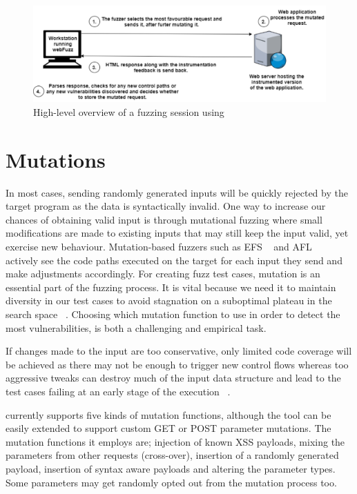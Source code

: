 \begin{figure}[ht]
 \centering
 \captionsetup{justification=centering}
 \includegraphics[width=\linewidth]{figures/architecture.pdf}
 \caption{High-level overview of a fuzzing session using \pname{}}
 \label{fig:architecture}
\end{figure}

\section{Mutations}
In most cases, sending randomly generated inputs will be quickly rejected by the target program as the data is syntactically invalid. One way to increase our chances of obtaining valid input is through mutational fuzzing where small modifications are made to existing inputs that may still keep the input valid, yet exercise new behaviour. Mutation-based fuzzers such as EFS ~\cite{efs2007} and AFL ~\cite{zalewski2015american} actively see the code paths executed on the target for each input they send and make adjustments accordingly. For creating fuzz test cases, mutation is an essential part of the fuzzing process. It is vital because we need it to maintain diversity in our test cases to avoid stagnation on a suboptimal plateau in the search space ~\cite{seal2016Genetic}. Choosing which mutation function to use in order to detect the most vulnerabilities, is both a challenging and empirical task. 

If changes made to the input are too conservative, only limited code coverage will be achieved as there may not be enough to trigger new control flows whereas too aggressive tweaks can destroy much of the input data structure and lead to the test cases failing at an early stage of the execution ~\cite{zalewski2014Mutations}.

\pname{} currently supports five kinds of mutation functions, although the tool can be easily
extended to support custom GET or POST parameter mutations. The mutation functions it employs are; injection of known XSS payloads, mixing the parameters from other requests (cross-over), insertion of a randomly generated payload, insertion of syntax aware payloads and altering the
parameter types. Some parameters may get randomly opted out from the mutation process too. 

